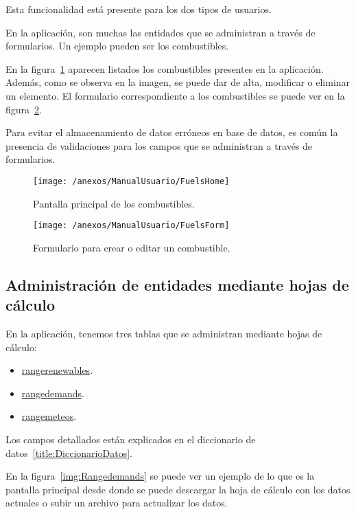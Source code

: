 Esta funcionalidad está presente para los dos tipos de usuarios. 

En la aplicación, son muchas las entidades que se administran a través de formularios. Un ejemplo pueden ser los combustibles.

En la figura~\ref{img:FuelsHome} aparecen listados los combustibles presentes en la aplicación. Además, como se observa en la imagen, se puede dar de alta, modificar o eliminar un elemento. El formulario correspondiente a los combustibles se puede ver en la figura~\ref{img:FuelsForm}.

Para evitar el almacenamiento de datos erróneos en base de datos, es común la presencia de validaciones para los campos que se administran a través de formularios. 

\begin{figure}[h]
	\centering
	\texttt{[image: /anexos/ManualUsuario/FuelsHome]}
	\caption{Pantalla principal de los combustibles.}
	\label{img:FuelsHome}
\end{figure}

\begin{figure}[h]
	\centering
	\texttt{[image: /anexos/ManualUsuario/FuelsForm]}
	\caption{Formulario para crear o editar un combustible.}
	\label{img:FuelsForm}
\end{figure}

\newpage

\subsection{Administración de entidades mediante hojas de cálculo}

En la aplicación, tenemos tres tablas que se administran mediante hojas de cálculo:
\begin{itemize}
	\item \href{https://www.proyectoubu.nesiweb.com/rangerenewables/technologies}{rangerenewables}.
	\item \href{https://www.proyectoubu.nesiweb.com/rangedemands/home}{rangedemands}.
	\item \href{https://www.proyectoubu.nesiweb.com/rangemeteos/home}{rangemeteos}.
\end{itemize}

Los campos detallados están explicados en el diccionario de datos~\ref{title:DiccionarioDatos}. 
 
En la figura~\ref{img:Rangedemands} se puede ver un ejemplo de lo que es la pantalla principal desde donde se puede descargar la hoja de cálculo con los datos actuales o subir un archivo para actualizar los datos.
 
